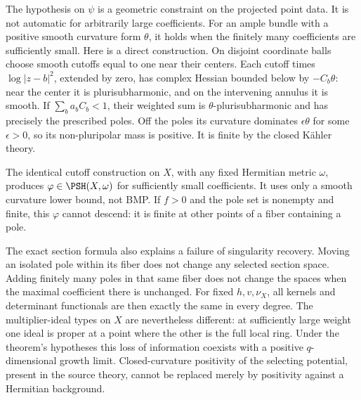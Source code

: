 The hypothesis on $\psi$ is a geometric constraint on the projected point data. It is not automatic for arbitrarily large coefficients. For an ample bundle with a positive smooth curvature form $\theta$, it holds when the finitely many coefficients are sufficiently small. Here is a direct construction. On disjoint coordinate balls choose smooth cutoffs equal to one near their centers. Each cutoff times $\log|z-b|^2$, extended by zero, has complex Hessian bounded below by $-C_b\theta$: near the center it is plurisubharmonic, and on the intervening annulus it is smooth. If $\sum_b a_bC_b<1$, their weighted sum is $\theta$-plurisubharmonic and has precisely the prescribed poles. Off the poles its curvature dominates $\epsilon\theta$ for some $\epsilon>0$, so its non-pluripolar mass is positive. It is finite by the closed K\"ahler theory.

The identical cutoff construction on $X$, with any fixed Hermitian metric $\omega$, produces $\varphi\in\PSH(X,\omega)$ for sufficiently small coefficients. It uses only a smooth curvature lower bound, not BMP. If $f>0$ and the pole set is nonempty and finite, this $\varphi$ cannot descend: it is finite at other points of a fiber containing a pole.

The exact section formula also explains a failure of singularity recovery. Moving an isolated pole within its fiber does not change any selected section space. Adding finitely many poles in that same fiber does not change the spaces when the maximal coefficient there is unchanged. For fixed $h,v,\nu_X$, all kernels and determinant functionals are then exactly the same in every degree. The multiplier-ideal types on $X$ are nevertheless different: at sufficiently large weight one ideal is proper at a point where the other is the full local ring. Under the theorem's hypotheses this loss of information coexists with a positive $q$-dimensional growth limit. Closed-curvature positivity of the selecting potential, present in the source theory, cannot be replaced merely by positivity against a Hermitian background.
